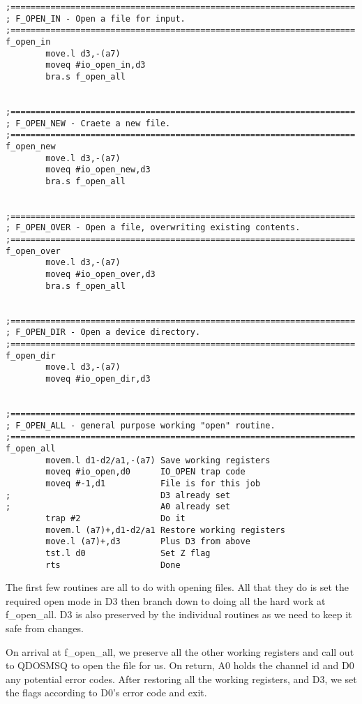 \begin{lstlisting}[firstnumber=1,]
;=====================================================================
; F_OPEN_IN - Open a file for input.
;=====================================================================
f_open_in
        move.l d3,-(a7)
        moveq #io_open_in,d3
        bra.s f_open_all


;=====================================================================
; F_OPEN_NEW - Craete a new file.
;=====================================================================
f_open_new
        move.l d3,-(a7)
        moveq #io_open_new,d3
        bra.s f_open_all


;=====================================================================
; F_OPEN_OVER - Open a file, overwriting existing contents.
;=====================================================================
f_open_over
        move.l d3,-(a7)
        moveq #io_open_over,d3
        bra.s f_open_all


;=====================================================================
; F_OPEN_DIR - Open a device directory.
;=====================================================================
f_open_dir
        move.l d3,-(a7)
        moveq #io_open_dir,d3


;=====================================================================
; F_OPEN_ALL - general purpose working "open" routine.
;=====================================================================
f_open_all
        movem.l d1-d2/a1,-(a7) Save working registers
        moveq #io_open,d0      IO_OPEN trap code
        moveq #-1,d1           File is for this job
;                              D3 already set
;                              A0 already set
        trap #2                Do it
        movem.l (a7)+,d1-d2/a1 Restore working registers
        move.l (a7)+,d3        Plus D3 from above
        tst.l d0               Set Z flag
        rts                    Done
\end{lstlisting}

The first few routines are all to do with opening files. All that
    they do is set the required open mode in D3 then branch down to doing all
    the hard work at f\_open\_all. D3 is also preserved by the individual
    routines as we need to keep it safe from changes.

On arrival at f\_open\_all, we preserve all the
    other working registers and call out to QDOSMSQ to open the file for us.
    On return, A0 holds the channel id and D0 any potential error codes. After
    restoring all the working registers, and D3, we set the flags according to
    D0's error code and exit.

